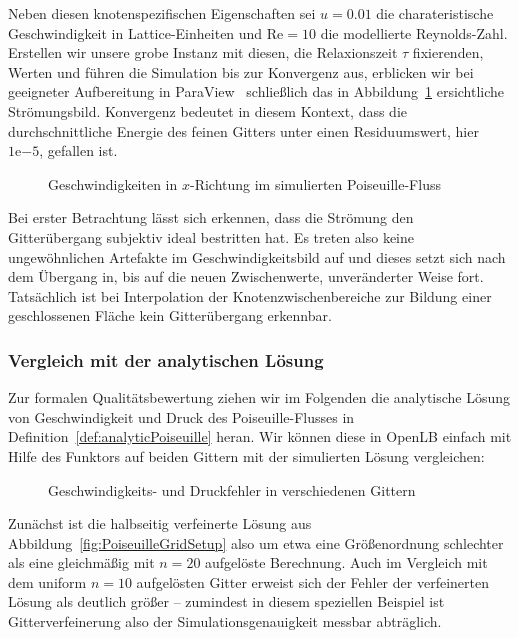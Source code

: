 Neben diesen knotenspezifischen Eigenschaften sei \(u=0.01\) die charateristische Geschwindigkeit in Lattice-Einheiten und \(\text{Re}=10\) die modellierte Reynolds-Zahl. Erstellen wir unsere grobe  Instanz mit diesen, die Relaxionszeit \(\tau\) fixierenden, Werten und führen die Simulation bis zur Konvergenz aus, erblicken wir bei geeigneter Aufbereitung in ParaView~\cite{paraview05} schließlich das in Abbildung~\ref{fig:PoiseuilleVelocityGrid} ersichtliche Strömungsbild. Konvergenz bedeutet in diesem Kontext, dass die durchschnittliche Energie des feinen Gitters unter einen Residuumswert, hier \(1\mathrm{e}{-5}\), gefallen ist.

\begin{figure}[h]
\begin{adjustbox}{center}

\end{adjustbox}
\caption{Geschwindigkeiten in \(x\)-Richtung im simulierten Poiseuille-Fluss}
\label{fig:PoiseuilleVelocityGrid}
\end{figure}

Bei erster Betrachtung lässt sich erkennen, dass die Strömung den Gitterübergang subjektiv ideal bestritten hat. Es treten also keine ungewöhnlichen Artefakte im Geschwindigkeitsbild auf und dieses setzt sich nach dem Übergang in, bis auf die neuen Zwischenwerte, unveränderter Weise fort. Tatsächlich ist bei Interpolation der Knotenzwischenbereiche zur Bildung einer geschlossenen Fläche kein Gitterübergang erkennbar.

\newpage
\subsubsection{Vergleich mit der analytischen Lösung}

Zur formalen Qualitätsbewertung ziehen wir im Folgenden die analytische Lösung von Geschwindigkeit und Druck des Poiseuille-Flusses in Definition~\ref{def:analyticPoiseuille} heran. Wir können diese in \mbox{OpenLB} einfach mit Hilfe des  Funktors auf beiden Gittern mit der simulierten Lösung vergleichen:

\begin{figure}[h]
\centering

\caption{Geschwindigkeits- und Druckfehler in verschiedenen Gittern}
\label{fig:PoiseuilleErrorNorm}
\end{figure}

Zunächst ist die halbseitig verfeinerte Lösung aus Abbildung~\ref{fig:PoiseuilleGridSetup} also um etwa eine Größenordnung schlechter als eine gleichmäßig mit \(n=20\) aufgelöste Berechnung. Auch im Vergleich mit dem uniform \(n=10\) aufgelösten Gitter erweist sich der Fehler der verfeinerten Lösung als deutlich größer -- zumindest in diesem speziellen Beispiel ist Gitterverfeinerung also der Simulationsgenauigkeit messbar abträglich.

